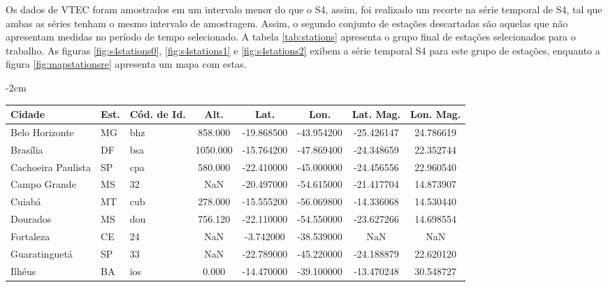 Os dados de VTEC foram amostrados em um intervalo menor do que o S4, assim, foi realizado um recorte na série temporal de S4, tal que ambas as séries tenham o mesmo intervalo de amostragem. Assim, o segundo conjunto de estações descartadas são aquelas que não apresentam medidas no período de tempo selecionado. A tabela \ref{tab:stations} apresenta o grupo final de estações selecionados para o trabalho. As figuras \ref{fig:s4stations0}, \ref{fig:s4stations1} e \ref{fig:s4stations2} exibem a série temporal S4 para este grupo de estações, enquanto a figura \ref{fig:mapstationsre} apresenta um mapa com estas.

\begin{table}
\addtolength{\leftskip} {-2cm} %
\addtolength{\rightskip}{-2cm}
\small
\begin{tabular}{|l|l|l|c|c|c|c|c|}
\hline
Cidade              & Est.  & Cód. de Id.           &  Alt.     &   Lat.     &  Lon.      &  Lat. Mag.    &  Lon. Mag.       \\ \hline
Belo Horizonte      &    MG &                   bhz &   858.000 & -19.868500 & -43.954200 &    -25.426147 &      24.786619   \\ \hline
Brasília            &    DF &                   bsa &  1050.000 & -15.764200 & -47.869400 &    -24.348659 &      22.352744   \\ \hline
Cachoeira Paulista  &    SP &                   cpa &   580.000 & -22.410000 & -45.000000 &    -24.456556 &      22.960540   \\ \hline
Campo Grande        &    MS &                    32 &       NaN & -20.497000 & -54.615000 &    -21.417704 &      14.873907   \\ \hline
Cuiabá              &    MT &                   cub &   278.000 & -15.555200 & -56.069800 &    -14.336068 &      14.530440   \\ \hline
Dourados            &    MS &                   dou &   756.120 & -22.110000 & -54.550000 &    -23.627266 &      14.698554   \\ \hline
Fortaleza           &    CE &                    24 &       NaN &  -3.742000 & -38.539000 &           NaN &            NaN   \\ \hline
Guaratinguetá       &    SP &                    33 &       NaN & -22.789000 & -45.220000 &    -24.188879 &      22.620120   \\ \hline
Ilhéus              &    BA &                   ios &     0.000 & -14.470000 & -39.100000 &    -13.470248 &      30.548727   \\ \hline

\end{tabular}
\end{table}
